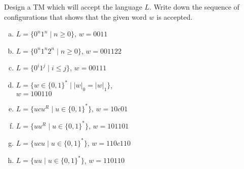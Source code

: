 \documentclass[a4paper,12pt]{amsart}
\begin{document}
\medskip\begin{problem}

    Design a TM which will accept the language $L$. Write down the sequence of configurations that shows that the given word $w$ is accepted. 
    
    \begin{multicols}{2}
    \begin{enumerate}[(a)]
        \item $L=\{0^n1^n\mid n\geq 0\}$, $w=0011$
        \item $L=\{0^n1^n2^n\mid n\geq 0\}$, $w=001122$
        \item $L=\{0^i1^j\mid i\leq j\}$, $w=00111$
        \item $L=\{w\in\{0,1\}^*\mid |w|_0=|w|_1\}$,\\ $w=100110$
        \item $L=\{ucu^R\mid u\in\{0,1\}^*\}$, $w=10c01$
        \item $L=\{uu^R\mid u\in\{0,1\}^*\}$, $w=101101$
        \item $L=\{ucu\mid u \in\{0,1\}^*\}$, $w=110c110$
        \item $L=\{uu\mid u \in\{0,1\}^*\}$, $w=110110$
    \end{enumerate}
    \end{multicols}

\end{problem}
\end{document}
